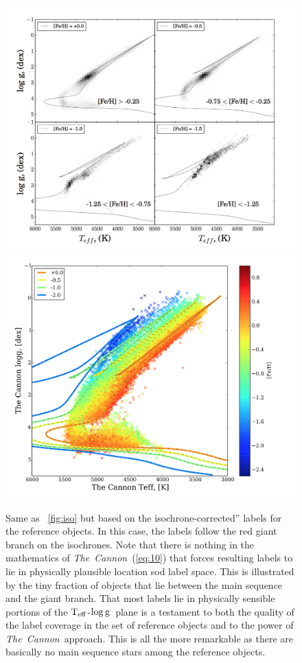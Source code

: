 \documentclass[12pt, preprint]{aastex}
\newcommand{\tc}{\textsl{The~Cannon}}
\newcommand{\teff}{\mbox{$\rm T_{eff}$}}
\newcommand{\logg}{\mbox{$\rm \log g$}}
\begin{document}
\begin{figure}[!h]
      \includegraphics[scale=0.25]{./plots/iso2.png}
  \hspace{-20pt}
    \includegraphics[scale=0.25]{./plots/iso2a.png}
\caption{Same as \figurename~\ref{fig:iso} but based on the isochrone-corrected'' labels for the reference objects. In this case, the labels follow the red giant branch on the isochrones. Note that there is nothing in the mathematics of \tc\ (\ref{eq:10}) that forces resulting labels to lie in physically plausible location sod label space. This is illustrated by the tiny fraction of objects that lie between the main sequence and the giant branch. That most labels lie in physically sensible portions of the \teff-\logg\ plane is a testament to both the quality of the label coverage in the set of reference objects and to the power of \tc\ approach. This is all the more remarkable as there are basically no main sequence stars among the reference objects.}
\label{fig:iso2}
\end{figure}
\end{document}
